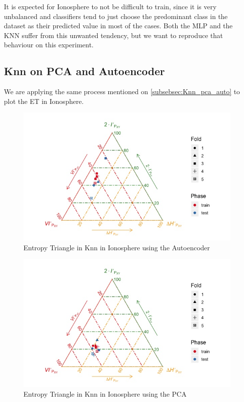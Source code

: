 It is expected for Ionosphere to not be difficult to train, since it is very unbalanced and classifiers tend to just choose the predominant class in the dataset as their predicted value in most of the cases. Both the MLP and the KNN suffer from this unwanted tendency, but we want to reproduce that behaviour on this experiment.

\subsection{Knn on PCA and Autoencoder}

We are applying the same process mentioned on \ref{subsebsec:Knn_pca_auto} to plot the ET in Ionosphere. 

\begin{figure}[H]
	\centering
	\includegraphics[width=1\linewidth]{Figuras_tfg/ET_knn_Ionosphere_auto}
	\caption{Entropy Triangle in Knn in Ionosphere using the Autoencoder}
	\label{fig:figure_Knn_Ionosphere_ET_Auto}
\end{figure}

\begin{figure}[H]
	\centering
	\includegraphics[width=1\linewidth]{Figuras_tfg/ET_knn_Ionosphere_pca}
	\caption{Entropy Triangle in Knn in Ionosphere using the PCA}
	\label{fig:figure_Knn_Ionosphere_ET_PCA}
\end{figure}

